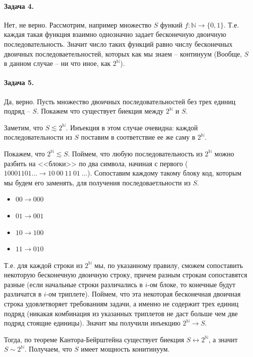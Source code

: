 \documentclass{article}
\newcommand{\N}{\mathbb{N}}
\begin{document}
    \paragraph{Задача 4.}
    Нет, не верно. Рассмотрим, например множество $S$ функий $f: \N \rightarrow \{0, 1\}$. Т.е. каждая такая функция взаимно однозначно задает бесконечную двоичную последовательность. Значит число таких функций равно числу бесконечных двоичных последоваетельностей, которых как мы знаем -- континуум (Вообще, $S$ в данном случае -- ни что иное, как $2^{\N}$).

    \paragraph{Задача 5.}
    Да, верно. Пусть множество двоичных последовательностей без трех единиц подряд -- $S$. Покажем что существует биекция между $2^{\N}$ и $S$.

    Заметим, что $S \apprle 2^{\N}$. Инъекция в этом случае очевидна: каждой последовательности из $S$ поставим в соответствие ее же саму в $2^{\N}$.

    Покажем, что $2^{\N} \apprle S$. Поймем, что любую последовательность из $2^{\N}$ можно разбить на <<блоки>> по два символа, начиная с первого ($10001101\ldots \rightarrow 10\ 00\ 11\ 01\ \ldots$). Сопоставим каждому такому блоку код, которым мы будем его заменять, для получения последоваетльности из $S$.

    \begin{itemize}
        \item $00 \rightarrow 000$
        \item $01 \rightarrow 001$
        \item $10 \rightarrow 100$
        \item $11 \rightarrow 010$
    \end{itemize}

    Т.е. для каждой строки из $2^{\N}$ мы, по указанному правилу, сможем сопоставить некоторую бесконечную двоичную строку, причем разным строкам сопоставятся разные (если начальные строки различались в $i$-ом блоке, то конечные будут различатся в $i$-ом триплете). Поймем, что эта некоторая бесконечная двоичная строка удовлетворяет требованиям задачи, а именно не содержит трех единиц подряд (никакая комбинация из указанных триплетов не даст больше чем две подряд стоящие единицы). Значит мы получили инъекцию $2^{\N} \rightarrow S$.

    Тогда, по теореме Кантора-Бейрштейна существует биекция $S \leftrightarrow 2^{\N}$, а значит $S \sim 2^{\N}$. Получаем, что $S$ имеет мощность конитинуум.
\end{document}
